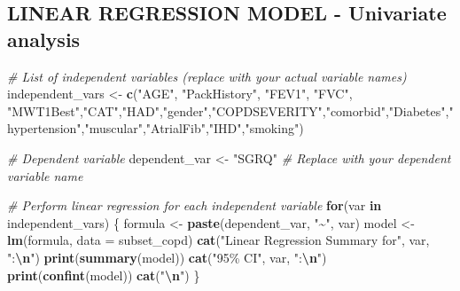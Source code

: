 \documentclass[
]{article}
\newenvironment{Shaded}{\begin{snugshade}}{\end{snugshade}}
\newcommand{\AttributeTok}[1]{\textcolor[rgb]{0.13,0.29,0.53}{#1}}
\newcommand{\CommentTok}[1]{\textcolor[rgb]{0.56,0.35,0.01}{\textit{#1}}}
\newcommand{\ControlFlowTok}[1]{\textcolor[rgb]{0.13,0.29,0.53}{\textbf{#1}}}
\newcommand{\FunctionTok}[1]{\textcolor[rgb]{0.13,0.29,0.53}{\textbf{#1}}}
\newcommand{\NormalTok}[1]{#1}
\newcommand{\OtherTok}[1]{\textcolor[rgb]{0.56,0.35,0.01}{#1}}
\newcommand{\SpecialCharTok}[1]{\textcolor[rgb]{0.81,0.36,0.00}{\textbf{#1}}}
\newcommand{\StringTok}[1]{\textcolor[rgb]{0.31,0.60,0.02}{#1}}
\begin{document}
\subsection{LINEAR REGRESSION MODEL - Univariate
analysis}\label{linear-regression-model---univariate-analysis}

\begin{Shaded}
\begin{Highlighting}[]
\CommentTok{\# List of independent variables (replace with your actual variable names)}
\NormalTok{independent\_vars }\OtherTok{\textless{}{-}} \FunctionTok{c}\NormalTok{(}\StringTok{"AGE"}\NormalTok{, }\StringTok{"PackHistory"}\NormalTok{, }\StringTok{"FEV1"}\NormalTok{, }\StringTok{"FVC"}\NormalTok{, }\StringTok{"MWT1Best"}\NormalTok{,}\StringTok{"CAT"}\NormalTok{,}\StringTok{"HAD"}\NormalTok{,}\StringTok{"gender"}\NormalTok{,}\StringTok{"COPDSEVERITY"}\NormalTok{,}\StringTok{"comorbid"}\NormalTok{,}\StringTok{"Diabetes"}\NormalTok{,}\StringTok{"hypertension"}\NormalTok{,}\StringTok{"muscular"}\NormalTok{,}\StringTok{"AtrialFib"}\NormalTok{,}\StringTok{"IHD"}\NormalTok{,}\StringTok{"smoking"}\NormalTok{)}

\CommentTok{\# Dependent variable}
\NormalTok{dependent\_var }\OtherTok{\textless{}{-}} \StringTok{"SGRQ"}  \CommentTok{\# Replace with your dependent variable name}

\CommentTok{\# Perform linear regression for each independent variable}
\ControlFlowTok{for}\NormalTok{(var }\ControlFlowTok{in}\NormalTok{ independent\_vars) \{}
\NormalTok{  formula }\OtherTok{\textless{}{-}} \FunctionTok{paste}\NormalTok{(dependent\_var, }\StringTok{"\textasciitilde{}"}\NormalTok{, var)}
\NormalTok{  model }\OtherTok{\textless{}{-}} \FunctionTok{lm}\NormalTok{(formula, }\AttributeTok{data =}\NormalTok{ subset\_copd)}
  \FunctionTok{cat}\NormalTok{(}\StringTok{"Linear Regression Summary for"}\NormalTok{, var, }\StringTok{":}\SpecialCharTok{\textbackslash{}n}\StringTok{"}\NormalTok{)}
  \FunctionTok{print}\NormalTok{(}\FunctionTok{summary}\NormalTok{(model))}
  \FunctionTok{cat}\NormalTok{(}\StringTok{"95\% CI"}\NormalTok{, var, }\StringTok{":}\SpecialCharTok{\textbackslash{}n}\StringTok{"}\NormalTok{)}
  \FunctionTok{print}\NormalTok{(}\FunctionTok{confint}\NormalTok{(model))}
  \FunctionTok{cat}\NormalTok{(}\StringTok{"}\SpecialCharTok{\textbackslash{}n}\StringTok{"}\NormalTok{)}
\NormalTok{\}}
\end{Highlighting}
\end{Shaded}
\end{document}
